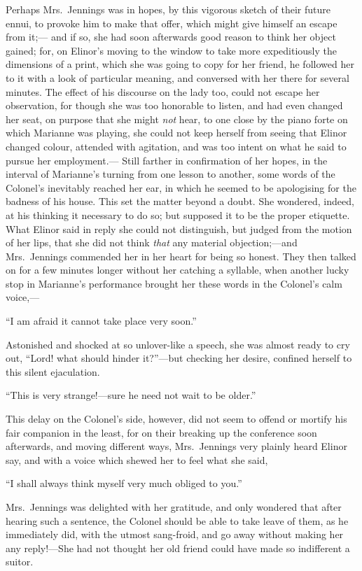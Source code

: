 Perhaps Mrs.\ Jennings was in hopes, by this vigorous
sketch of their future ennui, to provoke him to make
that offer, which might give himself an escape from it;---%
and if so, she had soon afterwards good reason to think
her object gained; for, on Elinor's moving to the window
to take more expeditiously the dimensions of a print,
which she was going to copy for her friend, he followed
her to it with a look of particular meaning, and conversed
with her there for several minutes.  The effect of his
discourse on the lady too, could not escape her observation,
for though she was too honorable to listen, and had even
changed her seat, on purpose that she might \emph{not} hear,
to one close by the piano forte on which Marianne
was playing, she could not keep herself from seeing
that Elinor changed colour, attended with agitation,
and was too intent on what he said to pursue her employment.---%
Still farther in confirmation of her hopes, in the interval
of Marianne's turning from one lesson to another,
some words of the Colonel's inevitably reached her ear,
in which he seemed to be apologising for the badness
of his house.  This set the matter beyond a doubt.
She wondered, indeed, at his thinking it necessary
to do so; but supposed it to be the proper etiquette.
What Elinor said in reply she could not distinguish,
but judged from the motion of her lips, that she did
not think \emph{that} any material objection;---and Mrs.\ Jennings
commended her in her heart for being so honest.
They then talked on for a few minutes longer without her
catching a syllable, when another lucky stop in Marianne's
performance brought her these words in the Colonel's calm voice,---%

``I am afraid it cannot take place very soon.''

Astonished and shocked at so unlover-like a speech,
she was almost ready to cry out, ``Lord! what should
hinder it?''---but checking her desire, confined herself
to this silent ejaculation.

``This is very strange!---sure he need not wait to be older.''

This delay on the Colonel's side, however, did not
seem to offend or mortify his fair companion in the least,
for on their breaking up the conference soon afterwards,
and moving different ways, Mrs.\ Jennings very plainly heard
Elinor say, and with a voice which shewed her to feel what she said,

``I shall always think myself very much obliged to you.''

Mrs.\ Jennings was delighted with her gratitude,
and only wondered that after hearing such a sentence,
the Colonel should be able to take leave of them, as he
immediately did, with the utmost sang-froid, and go away
without making her any reply!---She had not thought her old
friend could have made so indifferent a suitor.

